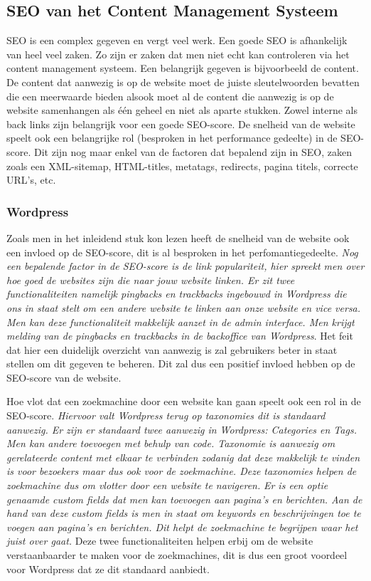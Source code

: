\subsection{SEO van het Content Management Systeem}
SEO is een complex gegeven en vergt veel werk. Een goede SEO is afhankelijk van heel veel zaken. Zo zijn er zaken dat men niet echt kan controleren via het content management systeem. Een belangrijk gegeven is bijvoorbeeld de content. De content dat aanwezig is op de website moet de juiste sleutelwoorden bevatten die een meerwaarde bieden alsook moet al de content die aanwezig is op de website samenhangen als één geheel en niet als aparte stukken. Zowel interne als back links zijn belangrijk voor een goede SEO-score. De snelheid van de website speelt ook een belangrijke rol (besproken in het performance gedeelte) in de SEO-score. Dit zijn nog maar enkel van de factoren dat bepalend zijn in SEO, zaken zoals een XML-sitemap, HTML-titles, metatags, redirects, pagina titels, correcte URL's, etc.

\subsubsection{Wordpress}
Zoals men in het inleidend stuk kon lezen heeft de snelheid van de website ook een invloed op de SEO-score, dit is al besproken in het perfomantiegedeelte.\textit{ Nog een bepalende factor in de SEO-score is de link populariteit, hier spreekt men over hoe goed de websites zijn die naar jouw website linken. Er zit twee functionaliteiten namelijk pingbacks en trackbacks ingebouwd in Wordpress die ons in staat stelt om een andere website te linken aan onze website en vice versa. Men kan deze functionaliteit makkelijk aanzet in de admin interface. Men krijgt melding van de pingbacks en trackbacks in de backoffice van Wordpress}.\autocite{WordpressCommunity2019e} Het feit dat hier een duidelijk overzicht van aanwezig is zal gebruikers beter in staat stellen om dit gegeven te beheren. Dit zal dus een positief invloed hebben op de SEO-score van de website.

Hoe vlot dat een zoekmachine door een website kan gaan speelt ook een rol in de SEO-score. \textit{Hiervoor valt Wordpress terug op taxonomies dit is standaard aanwezig. Er zijn er standaard twee aanwezig in Wordpress: Categories en Tags. Men kan andere toevoegen met behulp van code. Taxonomie is aanwezig om gerelateerde content met elkaar te verbinden zodanig dat deze makkelijk te vinden is voor bezoekers maar dus ook voor de zoekmachine. Deze taxonomies helpen de zoekmachine dus om vlotter door een website te navigeren.}\autocite{WordpressCommunity2019g} \textit{Er is een optie genaamde custom fields dat men kan toevoegen aan pagina's en berichten. Aan de hand van deze custom fields is men in staat om keywords en beschrijvingen toe te voegen aan pagina's en berichten. Dit helpt de zoekmachine te begrijpen waar het juist over gaat.}\autocite{WordpressCommunity2019h} Deze twee functionaliteiten helpen erbij om de website verstaanbaarder te maken voor de zoekmachines, dit is dus een groot voordeel voor Wordpress dat ze dit standaard aanbiedt.


